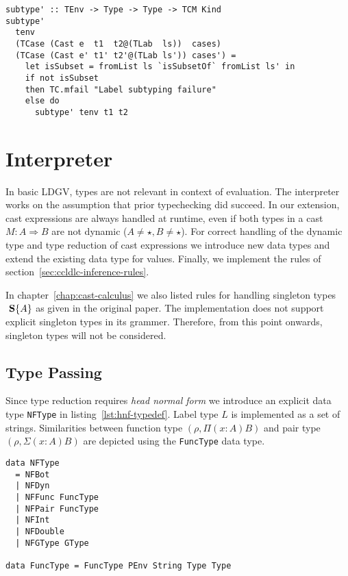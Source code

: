 \begin{lstlisting}[caption=Subtyping for casts in case terms (\texttt{TCSubtyping.hs})]
subtype' :: TEnv -> Type -> Type -> TCM Kind
subtype'
  tenv
  (TCase (Cast e  t1  t2@(TLab  ls))  cases)
  (TCase (Cast e' t1' t2'@(TLab ls')) cases') =
    let isSubset = fromList ls `isSubsetOf` fromList ls' in
    if not isSubset
    then TC.mfail "Label subtyping failure"
    else do
      subtype' tenv t1 t2
\end{lstlisting}


\section{Interpreter}

In basic LDGV, types are not relevant in context of evaluation. The interpreter works on the assumption that prior typechecking did succeed. In our extension, cast expressions are always handled at runtime, even if both types in a cast $M : A \Rightarrow B$ are not dynamic ($A \neq \star, B \neq \star$).
For correct handling of the dynamic type and type reduction of cast expressions we introduce new data types and extend the existing data type for values. Finally, we implement the rules of section~\ref{sec:ccldlc-inference-rules}.

In chapter~\ref{chap:cast-calculus} we also listed rules for handling singleton types $\text{ \textbf{S}}\{A\}$ as given in the original paper. The implementation does not support explicit singleton types in its grammer. Therefore, from this point onwards, singleton types will not be considered.

\subsection{Type Passing}

Since type reduction requires \emph{head normal form} we introduce an explicit data type \texttt{NFType} in listing~\ref{lst:hnf-typedef}. Label type $L$ is implemented as a set of strings. Similarities between function type $(\rho, \Pi(x:A)B)$ and pair type $(\rho, \Sigma(x:A)B)$ are  depicted using the \texttt{FuncType} data type.

\begin{lstlisting}[float,
  label=lst:hnf-typedef,
  caption=HNF type definition (\texttt{ProcessEnvironment.hs})]
data NFType
  = NFBot
  | NFDyn
  | NFFunc FuncType
  | NFPair FuncType
  | NFInt
  | NFDouble
  | NFGType GType

data FuncType = FuncType PEnv String Type Type
\end{lstlisting}

